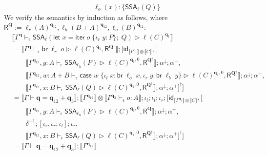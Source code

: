 \documentclass[acmsmall,screen,review]{acmart}
\newcommand{\mb}[1]{\ensuremath{\mathbf{#1}}}
\newcommand{\ms}[1]{\ensuremath{\mathsf{#1}}}
\newcommand{\lto}{:}
\newcommand{\linl}[1]{\iota_l\;{#1}}
\newcommand{\linr}[1]{\iota_r\;{#1}}
\newcommand{\letexpr}[3]{\ensuremath{\ms{let}\;#1 = #2;\;#3}}
\newcommand{\caseexpr}[5]{\ms{case}\;#1\;\{\linl{#2} \lto #3, \linr{#4} \lto #5\}}
\newcommand{\brb}[2]{\ms{br}\;#1\;#2}
\newcommand{\wbranch}[3]{#1(#2) \lto \{#3\}}
\newcommand{\liter}[3]{\ms{iter}\;#1\;\{ \linr{#2} \lto #3 \}}
\newcommand{\qsp}[4]{#1 \vdash #2 = #3 + #4}
\newcommand{\hasty}[4]{#1 \vdash_{#2} #3: {#4}}
\newcommand{\haslb}[4]{#1 \vdash_{#2} #3 \rhd #4}
\newcommand{\tossa}[2]{\ms{SSA}_{#1}(#2)}
\newcommand{\dnt}[1]{\llbracket{#1}\rrbracket}
\newcommand{\zeroqv}[1]{#1^\uparrow}
\begin{document}
\begin{itemize}
\begin{align*}
{      \wbranch{\ell_o}{x}{\tossa{\ell}{Q}}
    }
  \end{align*}
  We verify the semantics by induction as follows, where $\ms{R}^{\mb{Q}} := 
  \ell_r(A)^{\mb{q}_{12}}, \ell_h(B + A)^{\mb{q}_{12}}, \ell_o(B)^{\mb{q}_{12}}$:
  \begin{align*}
  & \dnt{
    \haslb{\Gamma^{\mb{q}}}{\epsilon}{\tossa{\ell}{\letexpr{x}{\liter{o}{y}{P}}{Q}}}
    {\ell(C)^{\mb{q}_1}}
  } \\
  &= \dnt{\haslb{\Gamma^{\mb{q}}}{\epsilon}{\brb{\ell_r}{o}}
        { 
          \ell(C)^{\mb{q}_1}, 
          \ms{R}^{\zeroqv{\mb{Q}}}
        }
      } ; [\ms{id}_{\dnt{\Gamma^{\mb{q}_1}} \otimes \dnt{C}}, [\\ & \qquad
      \dnt{\haslb{\Gamma^{\mb{q}_{12}}, y : A}{\epsilon}{\tossa{\ell_h}{P}}
        {
          \ell(C)^{\mb{q}_1, 0}, 
          \ms{R}^{\zeroqv{\mb{Q}}}
        }
      } ; \alpha^\downarrow ; \alpha^+, \\ & \qquad
      \dnt{\haslb{\Gamma^{\mb{q}_{12}}, w : A + B}{\epsilon}
        {\caseexpr{w}{x}{\brb{\ell_o}{x}}{y}{\brb{\ell_b}{y}}}
        {
          \ell(C)^{\mb{q}_1, 0}, 
          \ms{R}^{\zeroqv{\mb{Q}}}
        }
      } ; \alpha^\downarrow ; \alpha^+, \\ & \qquad
      \dnt{\haslb{\Gamma^{\mb{q}_{12}}, x : B}{\epsilon}
        {\tossa{\ell}{Q}}
        {
          \ell(C)^{\mb{q}_1, 0}, 
          \ms{R}^{\zeroqv{\mb{Q}}}
        }
      } ; \alpha^\downarrow ; \alpha^+
    ]^\dagger] \\
  &= \dnt{\qsp{\Gamma}{\mb{q}}{\mb{q}_{12}}{\mb{q}_3}}
      ; \dnt{\Gamma^{\mb{q}_{12}}} 
        \otimes \dnt{\hasty{\Gamma^{\mb{q}_3}}{\epsilon}{o}{A}}
      ; \iota_l ; \iota_l ; \iota_r
      ; [\ms{id}_{\dnt{\Gamma^{\mb{q}_1}} \otimes \dnt{C}}, [\\ & \qquad
      \dnt{\haslb{\Gamma^{\mb{q}_{12}}, y : A}{\epsilon}{\tossa{\ell_h}{P}}
        {
          \ell(C)^{\mb{q}_1, 0}, 
          \ms{R}^{\mb{Q}}
        }
      } ; \alpha^\downarrow ; \alpha^+, \\ & \qquad
      \delta^{-1} ; [\iota_r, \iota_r ; \iota_l] ; \iota_r, \\ & \qquad
      \dnt{\haslb{\Gamma^{\mb{q}_{12}}, x : B}{\epsilon}
        {\tossa{\ell}{Q}}
        {
          \ell(C)^{\mb{q}_1, 0}, 
          \ms{R}^{\zeroqv{\mb{Q}}}
        }
      } ; \alpha^\downarrow ; \alpha^+
    ]^\dagger] \\
  &= \dnt{\qsp{\Gamma}{\mb{q}}{\mb{q}_{12}}{\mb{q}_3}}
      ; \dnt{\Gamma^{\mb{q}_{12}}} 

\end{align*}
\end{itemize}
\end{document}
